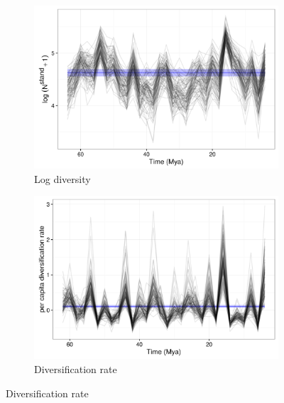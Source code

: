 \afterpage{\clearpage}
\begin{figure}[p]
  \begin{subfigure}[b]{0.45\textwidth}
    \includegraphics[width=\textwidth,height=0.4\textheight,keepaspectratio=true]{chapter_coping/figure/log_diversity}
    \caption{Log diversity}
    \label{fig:diversity_est}
  \end{subfigure}
  \begin{subfigure}[b]{0.45\textwidth}
    \includegraphics[width=\textwidth,height=0.4\textheight,keepaspectratio=true]{chapter_coping/figure/div_rate}
    \caption{Diversification rate}
    \label{fig:diversity_rate}
  \end{subfigure}


\end{figure}
